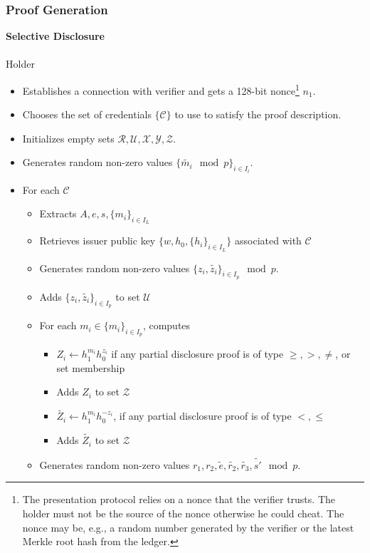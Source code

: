 \documentclass[a4paper]{article}
\begin{document}
\subsubsection{Proof Generation}
\textbf{Selective Disclosure}\\\\
Holder
\begin{itemize}
    \item Establishes a connection with verifier and gets a 128-bit nonce\footnote{The presentation protocol relies on a nonce that the verifier trusts. The holder must not be the source of the nonce otherwise he could cheat. The nonce may be, e.g., a random number generated by the verifier or the latest Merkle root hash from the ledger.} $n_1$.
    \item Chooses the set of credentials $\{\mathcal{C}\}$ to use to satisfy the proof description.
    \item Initializes empty sets $\mathcal{R}, \mathcal{U}, \mathcal{X}, \mathcal{Y}, \mathcal{Z}$.
    \item Generates random non-zero values $\{\widetilde{m_i} \mod p\}_{i \in I_l}$.
    \item For each $\mathcal{C}$
    \begin{itemize}
        \item Extracts $A, e, s, \{m_i\}_{i \in I_L}$
        \item Retrieves issuer public key $\{w, h_0, \{h_i\}_{i \in I_L}\}$ associated with $\mathcal{C}$
        \item Generates random non-zero values $\{z_i,\widetilde{z_i}\}_{i\in I_p} \mod p$.
        \item Adds $\{z_i,\widetilde{z_i}\}_{i\in I_p}$ to set $\mathcal{U}$
        \item For each $m_i \in \{m_i\}_{i \in I_p}$, computes
            \begin{itemize}
                \item $Z_i \leftarrow h_1^{m_i}h_0^{z_i}$ if any partial disclosure proof is of type $\geq, >,  \neq$, or set membership
                \item Adds $Z_i$ to set $\mathcal{Z}$
                \item $\widetilde{Z_i} \leftarrow h_1^{m_i}h_0^{-z_i}$, if any partial disclosure proof is of type $<, \leq$
                \item Adds $\widetilde{Z_i}$ to set $\mathcal{Z}$
            \end{itemize}
        \item Generates random non-zero values $r_1,r_2,\widetilde{e},\widetilde{r_2},\widetilde{r_3},\widetilde{s'} \mod p$.

\end{itemize}
\end{itemize}
\end{document}
